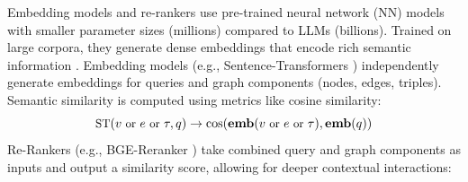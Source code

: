 {%
{\it {}} Embedding models and re-rankers use pre-trained neural network (NN) models with smaller parameter sizes (millions) compared to LLMs (billions). Trained on large corpora, they generate dense embeddings that encode rich semantic information {\cite{reimers-2019-sentence-bert}}. Embedding models (e.g., Sentence-Transformers {\cite{MiniLM}}) independently generate embeddings for queries and graph components (nodes, edges, triples). Semantic similarity is computed using metrics {\cite{jaccard, ChandrasekaranM21}} like cosine similarity: 
\begin{equation*}
\small
\text{ST}(v \text{ or } e \text{ or } \tau, q) \to \cos(\mathbf{emb}(v \text{ or } e \text{ or } \tau), \mathbf{emb}(q))
\end{equation*}
Re-Rankers (e.g., BGE-Reranker  {\cite{BGE}}) take combined query and graph components as inputs and output a similarity score, allowing for deeper contextual interactions:
\begin{equation*}

\end{equation*}}
